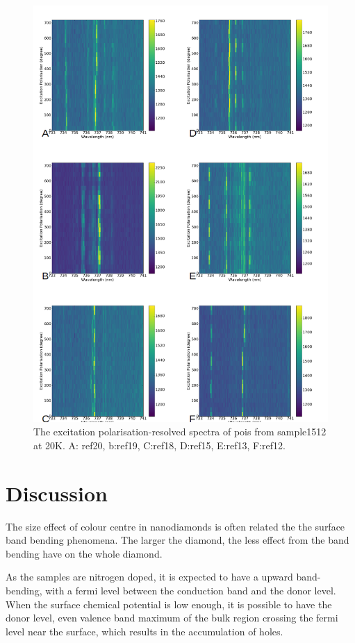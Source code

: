 \begin{figure}[h]
\centering
\includegraphics[width=1\linewidth]{Figures/pic/hydrogenterminationpolarisation}
\caption{The excitation polarisation-resolved spectra of pois from sample1512 at 20K. A: ref20, b:ref19, C:ref18, D:ref15, E:ref13, F:ref12.}
\label{fig:hydrogenterminationpolarisation}
\end{figure}

\section{Discussion}

The size effect of colour centre in nanodiamonds is often related the the surface band bending phenomena. The larger the diamond, the less effect from the band bending have on the whole diamond.

As the samples are nitrogen doped, it is expected to have a upward band-bending, with a fermi level between the conduction band and the donor level. When the surface chemical potential is low enough, it is possible to have the donor level, even valence band maximum of the bulk region crossing the fermi level near the surface, which results in the accumulation of holes. 


